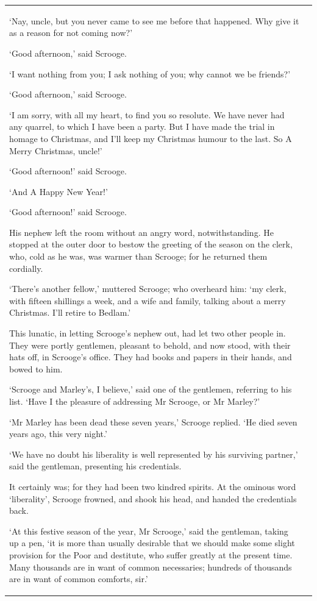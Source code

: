 \documentclass[11pt,twoside]{article}\makeatletter
\begin{document}
\begin{longtable}{P{0.19558457711442787\textwidth}P{0.6544154228855721\textwidth}}
‘Nay, uncle, but you never came to see me before that happened. Why give it as a reason for not coming now?’\par
‘Good afternoon,’ said Scrooge.\par
‘I want nothing from you; I ask nothing of you; why cannot we be friends?’\par
‘Good afternoon,’ said Scrooge.\par
‘I am sorry, with all my heart, to find you so resolute. We have never had any quarrel, to which I have been a party. But I have made the trial in homage to Christmas, and I'll keep my Christmas humour to the last. So A Merry Christmas, uncle!’\par
‘Good afternoon!’ said Scrooge.\par
‘And A Happy New Year!’\par
‘Good afternoon!’ said Scrooge.\par
His nephew left the room without an angry word, notwithstanding. He stopped at the outer door to bestow the greeting of the season on the clerk, who, cold as he was, was warmer than Scrooge; for he returned them cordially. \par
‘There's another fellow,’ muttered Scrooge; who overheard him: ‘my clerk, with fifteen shillings a week, and a wife and family, talking about a merry Christmas. I'll retire to Bedlam.’\par
This lunatic, in letting Scrooge's nephew out, had let two other people in. They were portly gentlemen, pleasant to behold, and now stood, with their hats off, in Scrooge's office. They had books and papers in their hands, and bowed to him. \par
‘Scrooge and Marley's, I believe,’ said one of the gentlemen, referring to his list. ‘Have I the pleasure of addressing Mr Scrooge, or Mr Marley?’\par
‘Mr Marley has been dead these seven years,’ Scrooge replied. ‘He died seven years ago, this very night.’\par
‘We have no doubt his liberality is well represented by his surviving partner,’ said the gentleman, presenting his credentials.\par
It certainly was; for they had been two kindred spirits. At the ominous word ‘liberality’, Scrooge frowned, and shook his head, and handed the credentials back.\par
‘At this festive season of the year, Mr Scrooge,’ said the gentleman, taking up a pen, ‘it is more than usually desirable that we should make some slight provision for the Poor and destitute, who suffer greatly at the present time. Many thousands are in want of common necessaries; hundreds of thousands are in want of common comforts, sir.’\par

\end{longtable}
\end{document}

